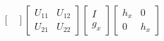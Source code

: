 \documentclass[bigger,handout]{beamer}
\begin{document}
\begin{frame}
\begin{itemize}
\begin{equation*}
\begin{bmatrix}
  \end{bmatrix}
  \begin{bmatrix}
  U_{11} & U_{12} \\
   U_{21} & U_{22}
  \end{bmatrix}
  \begin{bmatrix}
I \\
g_x
\end{bmatrix}
  \begin{bmatrix}
  h_{x} & 0 \\
   0 &   h_{x}
  \end{bmatrix}
\end{equation*}






\end{itemize}

\end{frame}%
\end{document}
